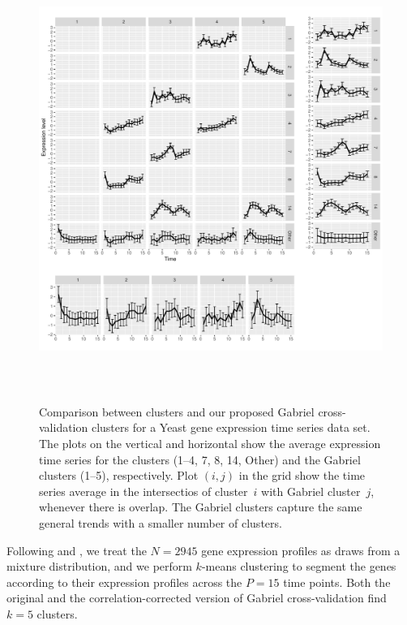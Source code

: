 \documentclass[12pt]{article}
\begin{document}
\begin{figure}
		\centering
	\includegraphics[width=5.7in, height=5.7in]{main_code/data_examples/split_plots.pdf}
	\caption{Comparison between  \cite{tavazoie1999systematic} clusters and
    our proposed Gabriel cross-validation clusters for a Yeast gene expression
    time series data set.  The plots on the vertical and horizontal
    show the average expression time series for the \citeauthor{tavazoie1999systematic} 
    clusters (1--4, 7, 8, 14, Other) and the Gabriel clusters (1--5),
    respectively. Plot $(i,j)$ in the grid show the time series average
    in the intersectios of  \citeauthor{tavazoie1999systematic} cluster~$i$
    with Gabriel cluster~$j$, whenever there is overlap. The Gabriel clusters
    capture the same general trends with a smaller number of clusters.
    }
	\label{fig:5_clusters}
\end{figure}	

Following \citet{tavazoie1999systematic} and \citet{dortet2008model}, we
treat the $N = 2945$ gene expression profiles as draws from a mixture
distribution, and we perform $k$-means clustering to segment the genes
according to their expression profiles across the $P = 15$ time points. 
Both the original and the correlation-corrected version of Gabriel
cross-validation find $k = 5$ clusters.
\end{document}
